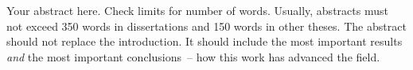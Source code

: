 Your abstract here. Check limits for number of words. Usually, abstracts must not exceed 350 words in dissertations and 150 words in other theses. The abstract should not replace the introduction. It should include the most important results \emph{and} the most important conclusions~-- how this work has advanced the field.

